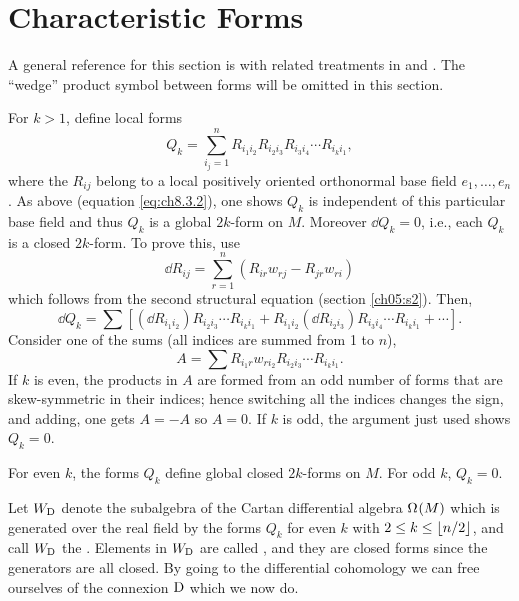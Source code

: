 \documentclass[../main]{subfiles}
\begin{document}
\section{Characteristic Forms}\label{ch08:s4}

A general reference for this section is \cite{chern1951topics} with related treatments in \cite{adler1957characteristic} and \cite{Cartan1949-1950}. The ``wedge'' product symbol between forms will be omitted in this section.

For $k>1$, define local forms
\[Q_k=\sum_{i_j=1}^n R_{i_1 i_2} R_{i_2 i_3} R_{i_3 i_4} \cdots R_{i_ki_1},\]
where the $R_{i j}$ belong to a local positively oriented orthonormal base field $e_1, \dots, e_n$. As above (equation \ref{eq:ch8.3.2}), one shows $Q_k$ is independent of this particular base field and thus $Q_k$ is a global $2k$-form on $M$. Moreover $\dd Q_k=0$, i.e., each $Q_k$ is a closed $2k$-form. To prove this, use
\[\dd R_{i j}=\sum_{r=1}^n(R_{ir}w_{rj}-R_{jr} w_{ri})\]
which follows from the second structural equation (section \ref{ch05:s2}). Then,
\[\dd Q_k=\sum[(\dd R_{i_1 i_2})R_{i_2 i_3}\cdots R_{i_k i_1}+R_{i_1 i_2}(\dd R_{i_2 i_3})R_{i_3 i_4}\cdots R_{i_k i_1}+\cdots].\]
Consider one of the sums (all indices are summed from 1 to $n$), \[A=\sum R_{i_1r}w_{ri_2}R_{i_2i_3}\cdots R_{i_ki_1}.\] If $k$ is even, the products in $A$ are formed from an odd number of forms that are skew-symmetric in their indices; hence switching all the indices changes the sign, and adding, one gets $A=-A$ so $A=0$. If $k$ is odd, the argument just used shows $Q_k=0$.



\begin{proposition} \label{prop:ch8.4.1}
For even $k$, the forms $Q_k$ define global closed $2 k$-forms on $M$. For odd $k$, $Q_k=0$.
\end{proposition}



Let $W_{\mathrm{D}}$ denote the subalgebra of the Cartan differential algebra $\Omega^{}(M)$ which is generated over the real field by the forms $Q_k$ for even $k$ with $2\leq k\leq\left\lfloor n/2\right\rfloor$, and call $W_{\mathrm{D}}$ the . Elements in $W_{\mathrm{D}}$ are called , and they are closed forms since the generators are all closed. By going to the differential cohomology we can free ourselves of the connexion $\mathrm{D}$ which we now do.
\end{document}
